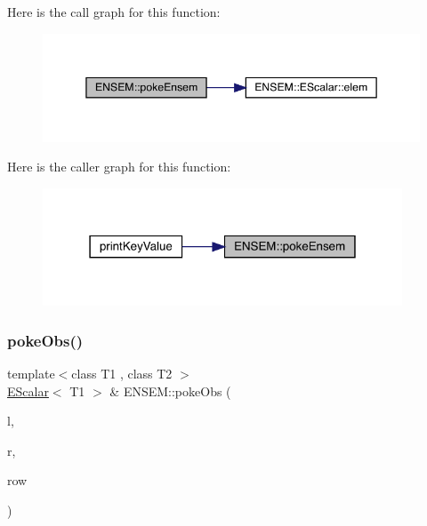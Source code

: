 Here is the call graph for this function\+:
\nopagebreak
\begin{figure}[H]
\begin{center}
\leavevmode
\includegraphics[width=345pt]{d4/dca/group__escalar_ga9528137f2a0461bf8dc2e6825f00464f_cgraph}
\end{center}
\end{figure}
Here is the caller graph for this function\+:
\nopagebreak
\begin{figure}[H]
\begin{center}
\leavevmode
\includegraphics[width=303pt]{d4/dca/group__escalar_ga9528137f2a0461bf8dc2e6825f00464f_icgraph}
\end{center}
\end{figure}
\mbox{\label{group__escalar_ga635de79045bc1565a78ea94b9ff967fb}} 
\subsubsection{\texorpdfstring{pokeObs()}{pokeObs()}\hspace{0.1cm}{\footnotesize\ttfamily [1/2]}}
{\footnotesize\ttfamily template$<$class T1 , class T2 $>$ \\
\mbox{\hyperlink{classENSEM_1_1EScalar}{E\+Scalar}}$<$ T1 $>$ \& E\+N\+S\+E\+M\+::poke\+Obs (\begin{DoxyParamCaption}\item[{\mbox{\hyperlink{classENSEM_1_1EScalar}{E\+Scalar}}$<$ T1 $>$ \&}]{l,  }\item[{const \mbox{\hyperlink{classENSEM_1_1EScalar}{E\+Scalar}}$<$ T2 $>$ \&}]{r,  }\item[{int}]{row }\end{DoxyParamCaption})\hspace{0.3cm}{\ttfamily [inline]}}



